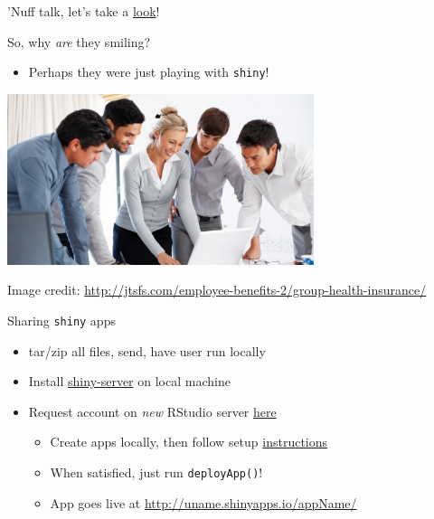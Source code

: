 \documentclass[sans,aspectratio=169,presentation,bigger,fleqn]{beamer}
\begin{document}
\begin{frame}[label=sec-26]{}
\vfill
\begin{center}
'Nuff talk, let's take a \href{https://jwhendy.shinyapps.io/insurance-visualizer/}{look}!
\end{center}
\vfill
\end{frame}

\begin{frame}[fragile,label=sec-27]{So, why \emph{are} they smiling?}
 \begin{itemize}
\item Perhaps they were just playing with \texttt{shiny}!
\end{itemize}

\begin{center}
\includegraphics[height=5cm]{./img/choosing-insurance.jpg}
\end{center}

\vspace{-0.5cm}

\tiny
Image credit: \url{http://jtsfs.com/employee-benefits-2/group-health-insurance/}
\end{frame}

\begin{frame}[fragile,label=sec-28]{Sharing \texttt{shiny} apps}
 \begin{itemize}
\item tar/zip all files, send, have user run locally
\item Install \href{http://www.rstudio.com/shiny/server/}{shiny-server} on local machine

\item Request account on \emph{new} RStudio server \href{https://www.shinyapps.io/admin/#/signup}{here}
\begin{itemize}
\item Create apps locally, then follow setup \href{https://github.com/rstudio/shinyapps/blob/master/guide/guide.md}{instructions}
\item When satisfied, just run \texttt{deployApp()}!
\item App goes live at \url{http://uname.shinyapps.io/appName/}
\end{itemize}
\end{itemize}
\end{frame}
\end{document}
